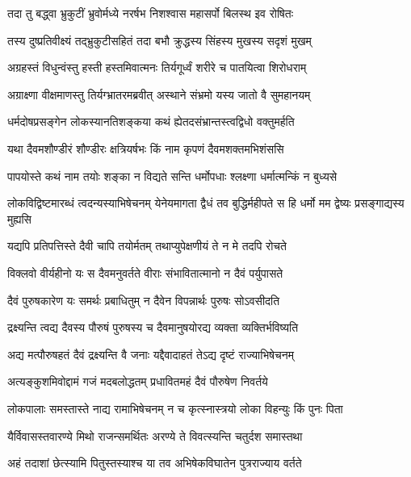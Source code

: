 \twolineshloka
{तदा तु बद्ध्वा भ्रुकुटीं भ्रुवोर्मध्ये नरर्षभ}
{निशश्वास महासर्पो बिलस्थ इव रोषितः} %

\twolineshloka
{तस्य दुष्प्रतिवीक्ष्यं तद्भ्रुकुटीसहितं तदा}
{बभौ क्रुद्धस्य सिंहस्य मुखस्य सदृशं मुखम्} %

\twolineshloka
{अग्रहस्तं विधुन्वंस्तु हस्ती हस्तमिवात्मनः}
{तिर्यगूर्ध्वं शरीरे च पातयित्वा शिरोधराम्} %

\twolineshloka
{अग्राक्ष्णा वीक्षमाणस्तु तिर्यग्भ्रातरमब्रवीत्}
{अस्थाने संभ्रमो यस्य जातो वै सुमहानयम्} %

\twolineshloka
{धर्मदोषप्रसङ्गेन लोकस्यानतिशङ्कया}
{कथं ह्येतदसंभ्रान्तस्त्वद्विधो वक्तुमर्हति} %

\twolineshloka
{यथा दैवमशौण्डीरं शौण्डीरः क्षत्रियर्षभः}
{किं नाम कृपणं दैवमशक्तमभिशंससि} %

\twolineshloka
{पापयोस्ते कथं नाम तयोः शङ्का न विद्यते}
{सन्ति धर्मोपधाः श्लक्ष्णा धर्मात्मन्किं न बुध्यसे} %

\threelineshloka
{लोकविद्विष्टमारब्धं त्वदन्यस्याभिषेचनम्}
{येनेयमागता द्वैधं तव बुद्धिर्महीपते}
{स हि धर्मो मम द्वेष्यः प्रसङ्गाद्यस्य मुह्यसि} %

\twolineshloka
{यद्यपि प्रतिपत्तिस्ते दैवी चापि तयोर्मतम्}
{तथाप्युपेक्षणीयं ते न मे तदपि रोचते} %

\twolineshloka
{विक्लवो वीर्यहीनो यः स दैवमनुवर्तते}
{वीराः संभावितात्मानो न दैवं पर्युपासते} %

\twolineshloka
{दैवं पुरुषकारेण यः समर्थः प्रबाधितुम्}
{न दैवेन विपन्नार्थः पुरुषः सोऽवसीदति} %

\twolineshloka
{द्रक्ष्यन्ति त्वद्य दैवस्य पौरुषं पुरुषस्य च}
{दैवमानुषयोरद्य व्यक्ता व्यक्तिर्भविष्यति} %

\twolineshloka
{अद्य मत्पौरुषहतं दैवं द्रक्ष्यन्ति वै जनाः}
{यद्दैवादाहतं तेऽद्य दृष्टं राज्याभिषेचनम्} %

\twolineshloka
{अत्यङ्कुशमिवोद्दामं गजं मदबलोद्धतम्}
{प्रधावितमहं दैवं पौरुषेण निवर्तये} %

\twolineshloka
{लोकपालाः समस्तास्ते नाद्य रामाभिषेचनम्}
{न च कृत्स्नास्त्रयो लोका विहन्युः किं पुनः पिता} %

\twolineshloka
{यैर्विवासस्तवारण्ये मिथो राजन्समर्थितः}
{अरण्ये ते विवत्स्यन्ति चतुर्दश समास्तथा} %

\twolineshloka
{अहं तदाशां छेत्स्यामि पितुस्तस्याश्च या तव}
{अभिषेकविघातेन पुत्रराज्याय वर्तते} %

